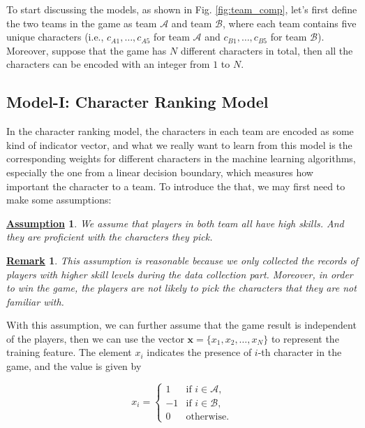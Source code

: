 \documentclass{article} %
\newtheorem{assumption}{\underline{Assumption}}
\newtheorem{remark}{\underline{Remark}}
\begin{document}
To start discussing the models,  as shown in Fig. \ref{fig:team_comp}, let's first define the two teams in the game as team $\mathcal{A}$ and team $\mathcal{B}$, where each team contains five unique characters (i.e., $c_{A1},\ldots,c_{A5}$ for team $\mathcal{A}$ and $c_{B1},\ldots,c_{B5}$ for team $\mathcal{B}$). Moreover, suppose that the game has $N$ different characters in total, then all the characters can be encoded with an integer from $1$ to $N$.

\subsection{Model-I: Character Ranking Model}

In the character ranking model, the characters in each team are encoded as some kind of indicator vector, and what we really want to learn from this model is the corresponding weights for different characters in the machine learning algorithms, especially the one from a linear decision boundary, which measures how important the character to a team. To introduce the that, we may first need to make some assumptions:

\begin{assumption}
We assume that players in both team all have high skills. And they are proficient with the characters they pick.
\end{assumption}

\begin{remark}
This assumption is reasonable because we only collected the records of players with
higher skill levels during the data collection part. Moreover, in order to win the game, the players are not likely to pick the characters that they are not familiar with.
\end{remark}

With this assumption, we can further assume that the game result is independent of the players, then we can use the vector $\textbf{x}=\{x_1,x_2,\ldots,x_N\}$ to represent the training feature. The element $x_i$ indicates the presence of $i$-th character in the game, and the value is given by

\begin{equation}
x_i =
\begin{cases}
1 &  \text{if $i\in \mathcal{A},$} \\
-1 &  \text{if $i\in \mathcal{B},$} \\
0 & \text{otherwise.}
\end{cases}
\end{equation}
\end{document}
